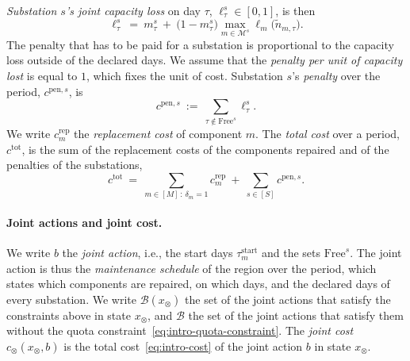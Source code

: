 \documentclass{article}
\begin{document}
\emph{Substation $s$'s joint capacity loss} on day $\tau$, $\ell^s_\tau \in [0,1]$, is then
\begin{equation}
\label{eq:intro-capacity-loss}
\ell^s_\tau \ =\ m^s_\tau \ +\ \big(1 - m^s_\tau\big)
\max_{m \in \mathcal{M}^s} \ell_m\big(\tilde{n}_{m,\tau}\big).
\end{equation}
The penalty that has to be paid for a substation is
proportional to the capacity loss outside of the declared days. We assume that the \emph{penalty per unit
of capacity lost} is equal to $1$, which fixes the unit of cost. Substation $s$'s \emph{penalty} over the period,
$c^{\mathrm{pen},s}$, is
\begin{equation}
\label{eq:intro-penalty}
c^{\mathrm{pen},s} \ :=\ \sum_{\tau \notin \text{Free}^s} \ell^s_\tau.
\end{equation}
We write $c^{\mathrm{rep}}_m$ the \emph{replacement cost} of component $m$. The \emph{total cost} over a period,
$c^{\mathrm{tot}}$, is the sum of the replacement costs of the components repaired and of the penalties of the substations,
\begin{equation}
\label{eq:intro-cost}
c^{\mathrm{tot}} \ =\ \sum_{m \in [M]\,:\, \delta_m = 1} c^{\mathrm{rep}}_m
\ +\ \sum_{s \in [S]} c^{\mathrm{pen},s}.
\end{equation}


\paragraph{Joint actions and joint cost.} We write $b$ the \emph{joint action}, i.e., the start days
$\tau^{\text{start}}_m$ and the sets $\text{Free}^s$. The joint action is thus the \emph{maintenance schedule} of the
region over the period, which states which components are repaired, on which days, and the declared days of every substation. We write $\mathcal{B}(x_\otimes)$ the set of the joint actions that
satisfy the constraints above in state $x_\otimes$, and $\mathcal{B}$ the set of the joint actions that satisfy them
without the quota constraint~\eqref{eq:intro-quota-constraint}. The \emph{joint cost} $c_\otimes(x_\otimes, b)$ is the
total cost~\eqref{eq:intro-cost} of the joint action $b$ in state $x_\otimes$.
\end{document}
